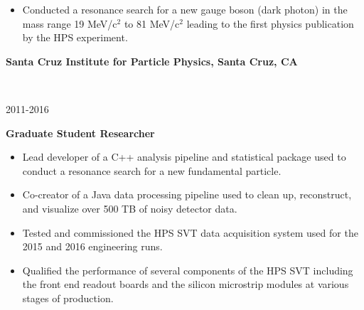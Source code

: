 \documentclass[11pt]{article}
\newcommand{\experienceentry}[5] { 
    \noindent
    \begin{minipage}[t]{0.84\textwidth} 
      \textbf{#1, #2}
    \end{minipage} \\[0.01pt]
    \begin{minipage}[t]{0.15\textwidth} \begin{flushright} #3 \end{flushright} \end{minipage} \hspace{0.01\textwidth}
    \begin{minipage}[t]{0.84\textwidth} 
      \textbf{\textcolor{indigodye}{#4}} \vspace{5pt} %
    \end{minipage} 
    #5 \vspace{11pt}
}
\begin{document}
{\begin{itemize}[label=\textcolor{indigodye}{$\circ$}, noitemsep, nolistsep, leftmargin=0.19\textwidth]
                \item Conducted a resonance search for a new gauge boson (dark photon) in the mass range 
                      19 MeV/c$^2$ to 81 MeV/c$^2$ leading to the first physics publication by the
                      HPS experiment.
            \end{itemize} 
                        } 
        \experienceentry{Santa Cruz Institute for Particle Physics}{Santa Cruz, CA}
                        {2011-2016}
                        {Graduate Student Researcher}
                        {   
            \begin{itemize}[label=\textcolor{indigodye}{$\circ$}, noitemsep, nolistsep, leftmargin=0.19\textwidth]
                \item Lead developer of a C++ analysis pipeline and statistical package
                      used to conduct a resonance search for a new fundamental particle.
                \item Co-creator of a Java data processing pipeline used to 
                      clean up, reconstruct, and visualize over 500 TB of noisy detector data. 
                \item Tested and commissioned the HPS SVT data acquisition system used for the 2015 and
                      2016 engineering runs. 
                \item Qualified the performance of several components of the HPS
                      SVT including the front end readout boards and the silicon microstrip
                      modules at various stages of production.
            \end{itemize} 
                      }
\end{document}
